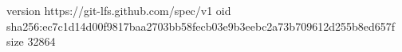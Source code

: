 version https://git-lfs.github.com/spec/v1
oid sha256:ec7c1d14d00f9817baa2703bb58fecb03e9b3eebc2a73b709612d255b8ed657f
size 32864
